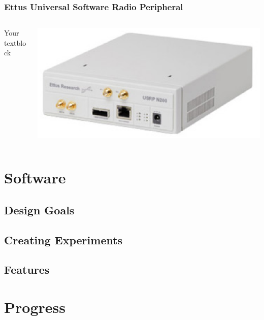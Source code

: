 \documentclass{beamer}
\begin{document}
\begin{frame}
\frametitle{Ettus Universal Software Radio Peripheral}
  \begin{columns}[T]
    \begin{column}{.5\textwidth}
     \begin{block}{Your textblock}
    \end{block}
    \end{column}
    \begin{column}{.5\textwidth}
    \begin{block}{}
    \includegraphics[width=\textwidth]{n200.eps}
    \end{block}
    \end{column}
  \end{columns}
\end{frame}

\section{Software}

\subsection{Design Goals}

\subsection{Creating Experiments}

\subsection{Features}

\section{Progress}
\end{document}
